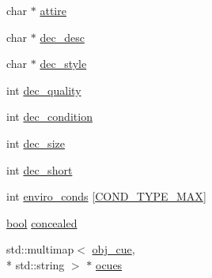 \begin{DoxyCompactItemize}
char $\ast$ \hyperlink{structobj__data_afeec748d15675c4fd3c4e03ed7061b5f}{attire}
\item 
char $\ast$ \hyperlink{structobj__data_a7ca38e59d41145bb6908245876548fd4}{dec\-\_\-desc}
\item 
char $\ast$ \hyperlink{structobj__data_a8e63675bf969348266df8ba8a451608c}{dec\-\_\-style}
\item 
int \hyperlink{structobj__data_aa6f2154accfbaabdcd450a11a9233079}{dec\-\_\-quality}
\item 
int \hyperlink{structobj__data_ac7693758728cd7e8f7d4ffdc51a916de}{dec\-\_\-condition}
\item 
int \hyperlink{structobj__data_a6a9ffe5837f57880397fa3dfec56a2ff}{dec\-\_\-size}
\item 
int \hyperlink{structobj__data_abc3cf61947fa992f629c5f53b82d2713}{dec\-\_\-short}
\item 
int \hyperlink{structobj__data_a96a86c009fc0ab1166a4cd812074ab93}{enviro\-\_\-conds} \mbox{[}\hyperlink{object__damage_8h_a900fe72fff2c343fd3f146c228d21196a3eb46d3d7318e8e02daa0c9b2e5540ca}{C\-O\-N\-D\-\_\-\-T\-Y\-P\-E\-\_\-\-M\-A\-X}\mbox{]}
\item 
\hyperlink{structs_8h_ad5c9d4ba3dc37783a528b0925dc981a0}{bool} \hyperlink{structobj__data_aba9df06479ef99a06974b669d486e8df}{concealed}
\item 
std\-::multimap$<$ \hyperlink{structs_8h_a58dde1a4922d995378d0dbc6b88d85bd}{obj\-\_\-cue}, \\*
std\-::string $>$ $\ast$ \hyperlink{structobj__data_a9252063584afada9689c7b3fcdee0494}{ocues}
\end{DoxyCompactItemize}


